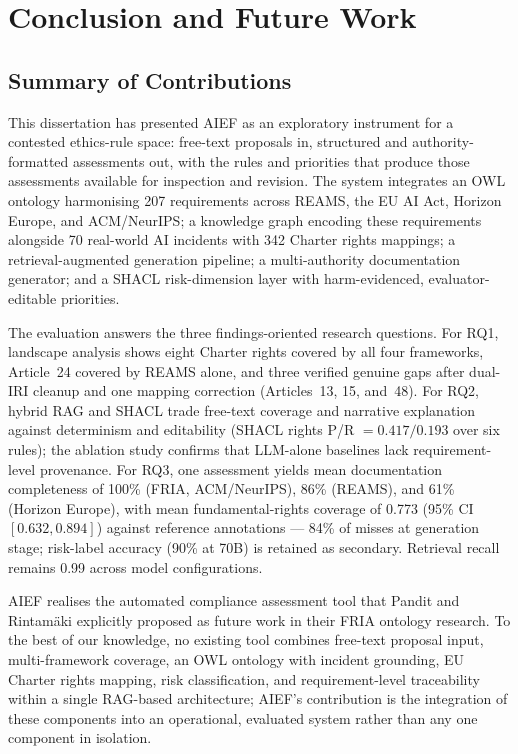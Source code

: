 \chapter{Conclusion and Future Work}
\label{ch:conclusion}

\section{Summary of Contributions}

This dissertation has presented AIEF as an exploratory instrument for a contested ethics-rule space: free-text proposals in, structured and authority-formatted assessments out, with the rules and priorities that produce those assessments available for inspection and revision. The system integrates an OWL ontology harmonising 207 requirements across REAMS, the EU AI Act, Horizon Europe, and ACM/NeurIPS; a knowledge graph encoding these requirements alongside 70 real-world AI incidents with 342 Charter rights mappings; a retrieval-augmented generation pipeline; a multi-authority documentation generator; and a SHACL risk-dimension layer with harm-evidenced, evaluator-editable priorities.

The evaluation answers the three findings-oriented research questions. For RQ1, landscape analysis shows eight Charter rights covered by all four frameworks, Article~24 covered by REAMS alone, and three verified genuine gaps after dual-IRI cleanup and one mapping correction (Articles~13, 15, and~48). For RQ2, hybrid RAG and SHACL trade free-text coverage and narrative explanation against determinism and editability (SHACL rights P/R $=0.417/0.193$ over six rules); the ablation study confirms that LLM-alone baselines lack requirement-level provenance. For RQ3, one assessment yields mean documentation completeness of 100\% (FRIA, ACM/NeurIPS), 86\% (REAMS), and 61\% (Horizon Europe), with mean fundamental-rights coverage of 0.773 (95\% CI $[0.632, 0.894]$) against reference annotations --- 84\% of misses at generation stage; risk-label accuracy (90\% at 70B) is retained as secondary. Retrieval recall remains 0.99 across model configurations.

AIEF realises the automated compliance assessment tool that Pandit and Rintam\"{a}ki \cite{pandit2024fria} explicitly proposed as future work in their FRIA ontology research. To the best of our knowledge, no existing tool combines free-text proposal input, multi-framework coverage, an OWL ontology with incident grounding, EU Charter rights mapping, risk classification, and requirement-level traceability within a single RAG-based architecture; AIEF's contribution is the integration of these components into an operational, evaluated system rather than any one component in isolation.


